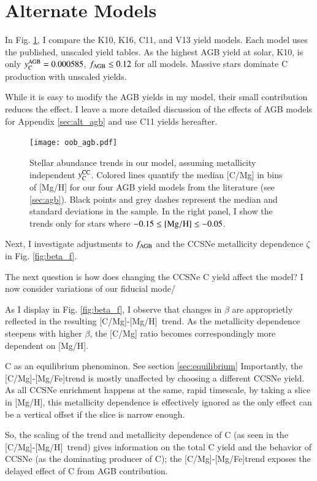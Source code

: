 \documentclass[12pt,oneside]{report}
\newcommand{\caah}{[C/Mg]-[Mg/H]}
\newcommand{\caafe}{[C/Mg]-[Mg/Fe]}
\newcommand{\Ycc}{\ensuremath{y_{\rm C}^{\rm CC}}}
\newcommand{\Ycagb}{\ensuremath{y_{\rm C}^{\rm AGB}}}
\begin{document}
\section{Alternate Models}

In Fig. \ref{fig:agb_sims}, I compare the K10, K16, C11, and V13 yield models. Each model uses the published, unscaled yield tables. As the highest AGB yield at solar, K10, is only $\Ycagb=0.000585$, $f_{\rm AGB} \leq 0.12$ for all models. Massive stars dominate C production with unscaled yields.


While it is easy to modify the AGB yields in my model, their small contribution reduces the effect. I leave a more detailed discussion of the effects of AGB models for Appendix \ref{sec:alt_agb} and use C11 yields hereafter.

\begin{figure}
\centering
\texttt{[image: oob\_agb.pdf]}
\caption[AGB GCE Models]{
    Stellar abundance trends in our model, assuming metallicity independent $\Ycc$. Colored lines quantify the median [C/Mg] in bins of [Mg/H] for our four AGB yield models from the literature (see \ref{sec:agb}). Black points and grey dashes represent the median and standard deviations in the \citet{jack_subgiant} sample. In the right panel, I show the trends only for stars where $-0.15\leq {\rm [Mg/H]}\leq -0.05$.
}
\label{fig:agb_sims}
\end{figure}

Next, I investigate adjustments to $f_{\rm AGB}$ and the CCSNe metallicity dependence $\zeta$ in Fig. \ref{fig:beta_f}. 


The next question is how does changing the CCSNe C yield affect the model?
I now consider variations of our fiducial mode/


As I display in Fig. \ref{fig:beta_f}, I observe that changes in $\beta$ are
approprietly reflected in the resulting \caah~trend. As the metallicity
dependence steepens with higher $\beta$, the [C/Mg] ratio becomes
correspondingly more dependent on [Mg/H].

C as an equilibrium phenominon. See section \ref{sec:equilibrium} Importantly, the \caafe trend is mostly unaffected by choosing a different
CCSNe yield. As all CCSNe enrichment happens at the same, rapid timescale, by
taking a slice in [Mg/H], this metallicity dependence is effectively ignored as
the only effect can be a vertical offset if the slice is narrow enough. 

So, the scaling of the trend and metallicity dependence of C (as seen in
the \caah~trend) gives information on the total C yield and the behavior
of CCSNe (as the dominating producer of C);
the \caafe trend exposes the delayed effect of C from AGB contribution.
\end{document}
